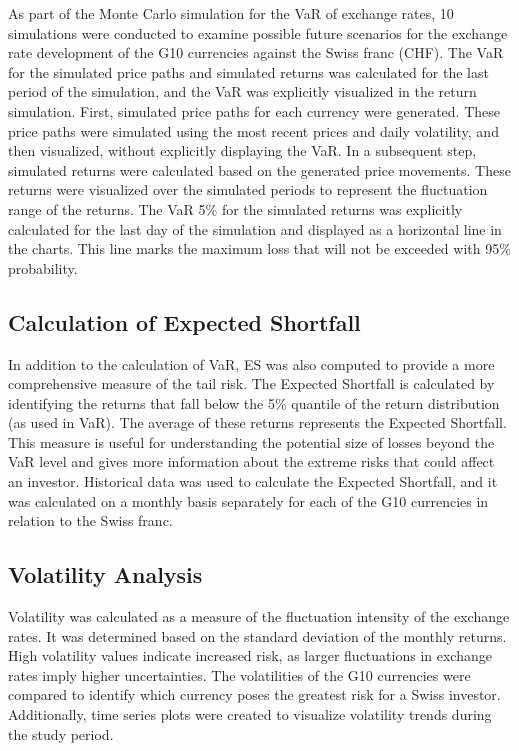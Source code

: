 \documentclass{article}
\begin{document}
As part of the Monte Carlo simulation for the VaR of exchange rates, 10 simulations were conducted to examine possible future scenarios for the exchange rate development of the G10 currencies against the Swiss franc (CHF). The VaR for the simulated price paths and simulated returns was calculated for the last period of the simulation, and the VaR was explicitly visualized in the return simulation.
First, simulated price paths for each currency were generated. These price paths were simulated using the most recent prices and daily volatility, and then visualized, without explicitly displaying the VaR.
In a subsequent step, simulated returns were calculated based on the generated price movements. These returns were visualized over the simulated periods to represent the fluctuation range of the returns. The VaR 5\% for the simulated returns was explicitly calculated for the last day of the simulation and displayed as a horizontal line in the charts. This line marks the maximum loss that will not be exceeded with 95\% probability.

\subsection{Calculation of Expected Shortfall}

In addition to the calculation of 
VaR, ES was also computed to provide a more comprehensive measure of the tail risk. The Expected Shortfall is calculated by identifying the returns that fall below the 5\% quantile of the return distribution (as used in VaR). The average of these returns represents the Expected Shortfall. This measure is useful for understanding the potential size of losses beyond the VaR level and gives more information about the extreme risks that could affect an investor. Historical data was used to calculate the Expected Shortfall, and it was calculated on a monthly basis separately for each of the G10 currencies in relation to the Swiss franc.

\subsection{Volatility Analysis}

Volatility was calculated as a measure of the fluctuation intensity of the exchange rates. It was determined based on the standard deviation of the monthly returns. High volatility values indicate increased risk, as larger fluctuations in exchange rates imply higher uncertainties. The volatilities of the G10 currencies were compared to identify which currency poses the greatest risk for a Swiss investor. Additionally, time series plots were created to visualize volatility trends during the study period.
\end{document}
